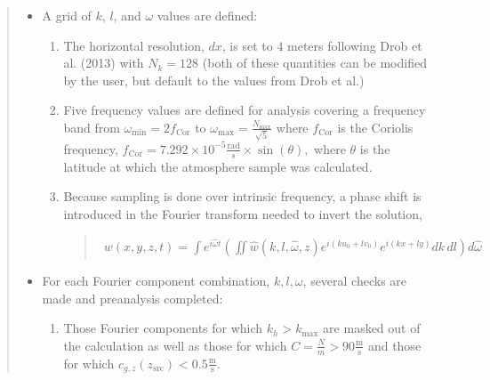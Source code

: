 \documentclass[letterpaper,10pt,english]{sphinxmanual}
\begin{document}
\begin{itemize}
\begin{quote}
\begin{itemize}
\begin{itemize}
\begin{enumerate}
\item {} 
\sphinxAtStartPar
The density scale height, \(H \left( z \right)\), is computed using finite differences of the ambient density.

\item {} 
\sphinxAtStartPar
Atmospheric fields are re\sphinxhyphen{}sampled on a higher resolution set of altitudes with \(dz = 200\) meters.

\end{enumerate}

\item {} 
\sphinxAtStartPar
A grid of \(k\), \(l\), and \(\omega\) values are defined:
\begin{enumerate}
%
\item {} 
\sphinxAtStartPar
The horizontal resolution, \(dx\), is set to 4 meters following Drob et al. (2013) with \(N_k = 128\) (both of these quantities can be modified by the user, but default to the values from Drob et al.)

\item {} 
\sphinxAtStartPar
Five frequency values are defined for analysis covering a frequency band from \(\omega_\text{min} = 2 f_\text{Cor}\) to \(\omega_\text{max} = \frac{N_\text{max}}{\sqrt{5}}\) where \(f_\text{Cor}\) is the Coriolis frequency, \(f_\text{Cor} = 7.292 \times 10^{-5} \frac{\text{rad}}{\text{s}} \times \sin \left( \theta \right),\) where \(\theta\) is the latitude at which the atmosphere sample was calculated.

\item {} 
\sphinxAtStartPar
Because sampling is done over intrinsic frequency, a phase shift is introduced in the Fourier transform needed to invert the solution,
\begin{quote}
\begin{equation*}
\begin{split}w \left( x, y, z, t \right) = \int{e^{i \hat{\omega} t} \left( \iint{ \hat{w} \left( k, l, \hat{\omega}, z \right) e^{i \left( k u_0 + l v_0 \right)} e^{i \left( kx + ly \right)} dk \, dl} \right) d \hat{\omega}}\end{split}
\end{equation*}\end{quote}

\end{enumerate}

\item {} 
\sphinxAtStartPar
For each Fourier component combination, \(k, l, \omega\), several checks are made and pre\sphinxhyphen{}analysis completed:
\begin{enumerate}
%
\item {} 
\sphinxAtStartPar
Those Fourier components for which \(k_h > k_\text{max}\) are masked out of the calculation as well as those for which \(C = \frac{N}{m} > 90 \frac{\text{m}}{\text{s}}\) and those for which \(c_{g,z} \left( z_\text{src} \right) < 0.5 \frac{\text{m}}{\text{s}}\).


\end{enumerate}
\end{itemize}
\end{itemize}
\end{quote}
\end{itemize}
\end{document}
